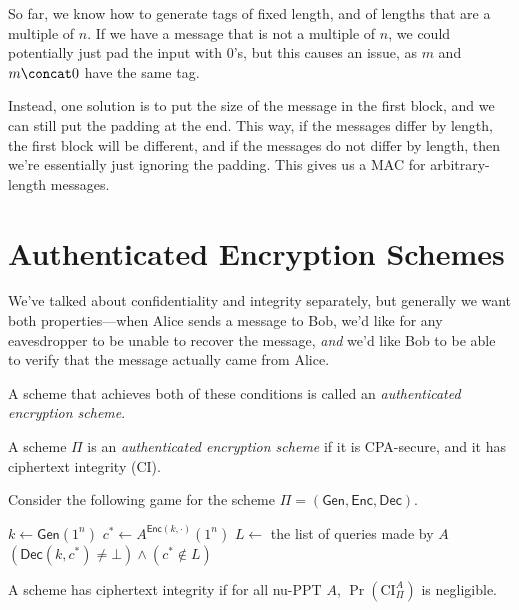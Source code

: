 \documentclass[12pt]{tufte-book}
\begin{document}
So far, we know how to generate tags of fixed length, and of lengths that are a multiple of $n$. If we have a message that is not a multiple of $n$, we could potentially just pad the input with 0's, but this causes an issue, as $m$ and $m \concat 0$ have the same tag.

Instead, one solution is to put the size of the message in the first block, and we can still put the padding at the end. This way, if the messages differ by length, the first block will be different, and if the messages do not differ by length, then we're essentially just ignoring the padding. This gives us a MAC for arbitrary-length messages.

\section{Authenticated Encryption Schemes}

We've talked about confidentiality and integrity separately, but generally we want both properties---when Alice sends a message to Bob, we'd like for any eavesdropper to be unable to recover the message, \emph{and} we'd like Bob to be able to verify that the message actually came from Alice.

A scheme that achieves both of these conditions is called an \emph{authenticated encryption scheme}.

\begin{definition}
    A scheme $\Pi$ is an \emph{authenticated encryption scheme} if it is CPA-secure, and it has ciphertext integrity (CI).
\end{definition}

\begin{definition}
    Consider the following game for the scheme $\Pi = (\mathsf{Gen}, \mathsf{Enc}, \mathsf{Dec})$.

    \begin{algorithmic}[1]
            \State $k \gets \mathsf{Gen}(1^n)$
            \State $c^* \gets A^{\mathsf{Enc}(k, \cdot)}(1^n)$
            \State $L \gets$ the list of queries made by $A$
            \State \Return $(\mathsf{Dec}(k, c^*) \ne \bot) \land (c^* \notin L)$
        \EndFunction
    \end{algorithmic}

    A scheme has ciphertext integrity if for all nu-PPT $A$, $\Pr(\mathrm{CI}_{\Pi}^A)$ is negligible.
\end{definition}
\end{document}
